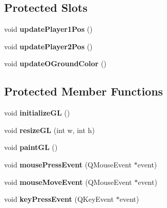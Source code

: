 \subsection*{Protected Slots}
\begin{DoxyCompactItemize}
\item 
\hypertarget{class_game_af79d7cfc146a74d69fe2cbc9f39ddd54}{}void {\bfseries update\+Player1\+Pos} ()\label{class_game_af79d7cfc146a74d69fe2cbc9f39ddd54}

\item 
\hypertarget{class_game_a73139d0f4c34ebfca2b79877d552a39d}{}void {\bfseries update\+Player2\+Pos} ()\label{class_game_a73139d0f4c34ebfca2b79877d552a39d}

\item 
\hypertarget{class_game_ac71e0aadacf88a71f644f4accc1d5d0c}{}void {\bfseries update\+O\+Ground\+Color} ()\label{class_game_ac71e0aadacf88a71f644f4accc1d5d0c}

\end{DoxyCompactItemize}
\subsection*{Protected Member Functions}
\begin{DoxyCompactItemize}
\item 
\hypertarget{class_game_a94d3832f6cd4ea6fe77127b5ce416e08}{}void {\bfseries initialize\+G\+L} ()\label{class_game_a94d3832f6cd4ea6fe77127b5ce416e08}

\item 
\hypertarget{class_game_ae0e64dfe8c1cdc82700cdad1ebcb0488}{}void {\bfseries resize\+G\+L} (int w, int h)\label{class_game_ae0e64dfe8c1cdc82700cdad1ebcb0488}

\item 
\hypertarget{class_game_a893aebaba4c902d2b028cc32a8ed75e9}{}void {\bfseries paint\+G\+L} ()\label{class_game_a893aebaba4c902d2b028cc32a8ed75e9}

\item 
\hypertarget{class_game_a704ba119948eebd1b6dfc547de967796}{}void {\bfseries mouse\+Press\+Event} (Q\+Mouse\+Event $\ast$event)\label{class_game_a704ba119948eebd1b6dfc547de967796}

\item 
\hypertarget{class_game_ad761e49ff42758930e76b477d08ba068}{}void {\bfseries mouse\+Move\+Event} (Q\+Mouse\+Event $\ast$event)\label{class_game_ad761e49ff42758930e76b477d08ba068}

\item 
\hypertarget{class_game_a08d72c91a6daedc8fa48194253f5e567}{}void {\bfseries key\+Press\+Event} (Q\+Key\+Event $\ast$event)\label{class_game_a08d72c91a6daedc8fa48194253f5e567}

\end{DoxyCompactItemize}



